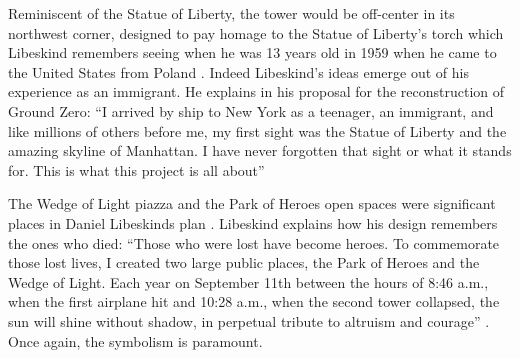 Reminiscent of the
Statue of Liberty, the tower would be off-center in its northwest
corner, designed to pay homage to the Statue of Liberty’s torch which
Libeskind remembers seeing when he was 13 years old in 1959 when he
came to the United States from Poland \citep{swanson2011}.  Indeed Libeskind’s
ideas emerge out of his experience as an immigrant.  He explains in his
proposal for the reconstruction of Ground Zero: ``I
arrived by ship to New York as a teenager, an immigrant, and like
millions of others before me, my first sight was the Statue of Liberty
and the amazing skyline of Manhattan.  I have never forgotten that
sight or what it stands for.  This is what this project is all about'' \citep{libeskind2012}

The Wedge of Light piazza and the Park of Heroes open spaces were
significant places in Daniel Libeskind{\textquotesingle}s plan
\citep{manhattan2003}.  Libeskind explains how his design
remembers the ones who died: “Those who were lost
have become heroes.  To commemorate those lost lives, I created two
large public places, the Park of Heroes and the Wedge of Light.  Each
year on September 11th between the hours of 8:46 a.m., when the first
airplane hit and 10:28 a.m., when the second tower collapsed, the sun
will shine without shadow, in perpetual tribute to altruism and
courage” \citep{libeskind2012}.  Once again, the symbolism
is paramount.  


